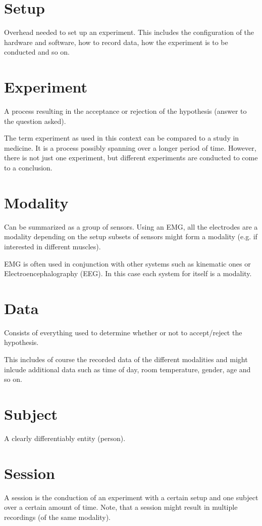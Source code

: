 \documentclass[letterpaper,10pt,english]{sphinxmanual}
\begin{document}
\section{Setup}
\label{taxonomy:setup}
Overhead needed to set up an experiment. This includes the configuration of the
hardware and software, how to record data, how the experiment is to be conducted
and so on.


\section{Experiment}
\label{taxonomy:experiment}
A process resulting in the acceptance or rejection of the hypothesis (answer to
the question asked).

The term experiment as used in this context can be compared to a study in
medicine. It is a process possibly spanning over a longer period of time.
However, there is not just one experiment, but different experiments are
conducted to come to a conclusion.


\section{Modality}
\label{taxonomy:modality}
Can be summarized as a group of sensors. Using an EMG, all the electrodes are a
modality depending on the setup subsets of sensors
might form a modality (e.g. if interested in different muscles).

EMG is often used in conjunction with other systems such as kinematic ones or
Electroencephalography (EEG). In this case each system for itself is a modality.


\section{Data}
\label{taxonomy:data}
Consists of everything used to determine whether or not to accept/reject the
hypothesis.

This includes of course the recorded data of the different modalities and
might inlcude additional data such as time of day, room temperature, gender,
age and so on.


\section{Subject}
\label{taxonomy:subject}
A clearly differentiably entity (person).


\section{Session}
\label{taxonomy:session}
A session is the conduction of an experiment with a certain setup and one
subject over a certain amount of time. Note, that a session might result in
multiple recordings (of the same modality).
\end{document}
